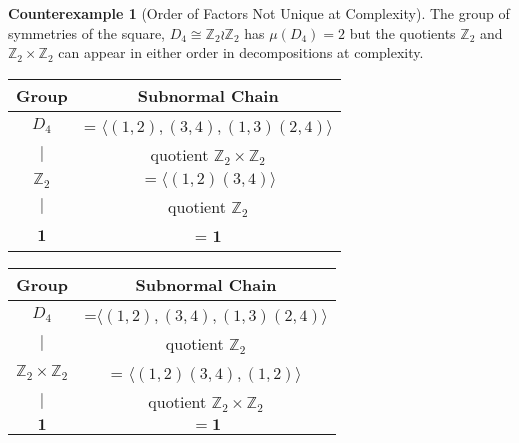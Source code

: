 \documentclass[a4paper,11pt]{amsart}
\theoremstyle{definition}
\newtheorem{counterexample}[example]{Counterexample}
\newcommand{\Z}{\mathbb{Z}}
\newcommand{\1}{{\mathbf 1}}
\begin{document}
\begin{counterexample}[Order of Factors Not Unique at Complexity] The group of symmetries of the square, $D_4\cong \Z_2\wr \Z_2$ has
$\mu(D_4)=2$ but the quotients $\Z_2$ and $\Z_2\times \Z_2$ can appear in either order in decompositions at complexity.\\ \label{D4}
\begin{tabular}{|c|c|}
                                         
	\hline
                                         
	Group &  Subnormal Chain \\
                                         
	\hline 

                                         
	$D_4$ & = $\langle (1,2), (3,4), (1,3)(2,4)\rangle $ \\ 
	$|{}$ & quotient $\Z_2\times \Z_2 $ \\ 
	$\Z_2$ &$=\langle   (1,2)(3,4)\rangle $ \\ 
	$|{}$ & quotient $\Z_2$ \\ 
	$\1$ & = $\1$\\

                                         
	\hline
                                         
\end{tabular}
\begin{tabular}{|c|c|}
                                         
	\hline
                                         
	Group & Subnormal Chain \\
                                         
	\hline 

                                         
	$D_4$ & =$\langle  (1,2), (3,4), (1,3)(2,4)\rangle $ \\ 
	$|{}$ & quotient $\Z_2$\\ 
	$\Z_2\times \Z_2$ & = $\langle (1,2)(3,4), (1,2) \rangle $\\ 
		$|{}$ & quotient $\Z_2 \times \Z_2$ \\ 
	$\1$ &  $=\1$ \\

                                         
	\hline
                                         
\end{tabular}
\end{counterexample}
\end{document}
